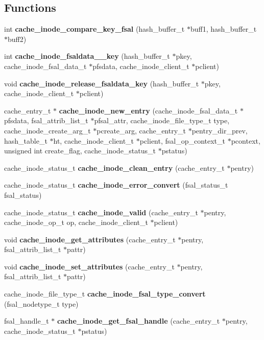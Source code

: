\subsection*{Functions}
\begin{CompactItemize}
\item 
int {\bf cache\_\-inode\_\-compare\_\-key\_\-fsal} (hash\_\-buffer\_\-t $\ast$buff1, hash\_\-buffer\_\-t $\ast$buff2)
\item 
int {\bf cache\_\-inode\_\-fsaldata\_\_\-key} (hash\_\-buffer\_\-t $\ast$pkey, cache\_\-inode\_\-fsal\_\-data\_\-t $\ast$pfsdata, cache\_\-inode\_\-client\_\-t $\ast$pclient)
\item 
void {\bf cache\_\-inode\_\-release\_\-fsaldata\_\-key} (hash\_\-buffer\_\-t $\ast$pkey, cache\_\-inode\_\-client\_\-t $\ast$pclient)
\item 
cache\_\-entry\_\-t $\ast$ {\bf cache\_\-inode\_\-new\_\-entry} (cache\_\-inode\_\-fsal\_\-data\_\-t $\ast$pfsdata, fsal\_\-attrib\_\-list\_\-t $\ast$pfsal\_\-attr, cache\_\-inode\_\-file\_\-type\_\-t type, cache\_\-inode\_\-create\_\-arg\_\-t $\ast$pcreate\_\-arg, cache\_\-entry\_\-t $\ast$pentry\_\-dir\_\-prev, hash\_\-table\_\-t $\ast$ht, cache\_\-inode\_\-client\_\-t $\ast$pclient, fsal\_\-op\_\-context\_\-t $\ast$pcontext, unsigned int create\_\-flag, cache\_\-inode\_\-status\_\-t $\ast$pstatus)
\item 
cache\_\-inode\_\-status\_\-t {\bf cache\_\-inode\_\-clean\_\-entry} (cache\_\-entry\_\-t $\ast$pentry)
\item 
cache\_\-inode\_\-status\_\-t {\bf cache\_\-inode\_\-error\_\-convert} (fsal\_\-status\_\-t fsal\_\-status)
\item 
cache\_\-inode\_\-status\_\-t {\bf cache\_\-inode\_\-valid} (cache\_\-entry\_\-t $\ast$pentry, cache\_\-inode\_\-op\_\-t op, cache\_\-inode\_\-client\_\-t $\ast$pclient)
\item 
void {\bf cache\_\-inode\_\-get\_\-attributes} (cache\_\-entry\_\-t $\ast$pentry, fsal\_\-attrib\_\-list\_\-t $\ast$pattr)
\item 
void {\bf cache\_\-inode\_\-set\_\-attributes} (cache\_\-entry\_\-t $\ast$pentry, fsal\_\-attrib\_\-list\_\-t $\ast$pattr)
\item 
cache\_\-inode\_\-file\_\-type\_\-t {\bf cache\_\-inode\_\-fsal\_\-type\_\-convert} (fsal\_\-nodetype\_\-t type)
\item 
fsal\_\-handle\_\-t $\ast$ {\bf cache\_\-inode\_\-get\_\-fsal\_\-handle} (cache\_\-entry\_\-t $\ast$pentry, cache\_\-inode\_\-status\_\-t $\ast$pstatus)
\item 

\end{CompactItemize}
